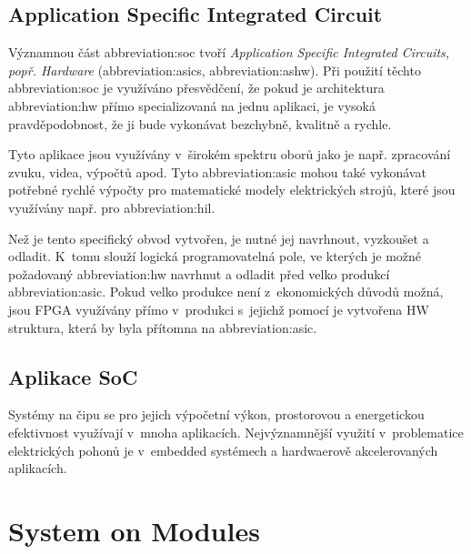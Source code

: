 \documentclass[a4paper, twoside, 11pt]{article}
\begin{document}
	\subsection{Application Specific Integrated Circuit}
		Významnou část \gls{abbreviation:soc} tvoří \textit{Application Specific Integrated Circuits, popř. Hardware} (\gls{abbreviation:asics}, \gls{abbreviation:ashw}). Při použití těchto \gls{abbreviation:soc} je využíváno přesvědčení, že pokud je architektura \gls{abbreviation:hw} přímo specializovaná na jednu aplikaci, je vysoká pravděpodobnost, že ji bude vykonávat bezchybně, kvalitně a rychle.\par
		Tyto aplikace jsou využívány v~širokém spektru oborů jako je např. zpracování zvuku, videa, výpočtů apod. Tyto \gls{abbreviation:asic} mohou také vykonávat potřebné rychlé výpočty pro matematické modely elektrických strojů, které jsou využívány např. pro \gls{abbreviation:hil}.\par
		Než je tento specifický obvod vytvořen, je nutné jej navrhnout, vyzkoušet a odladit. K~tomu slouží logická programovatelná pole, ve kterých je možné požadovaný \gls{abbreviation:hw} navrhnut a odladit před velko produkcí \gls{abbreviation:asic}. Pokud velko produkce není z~ekonomických důvodů možná, jsou FPGA využívány přímo v~produkci s~jejichž pomocí je vytvořena HW struktura, která by byla přítomna na \gls{abbreviation:asic}.


	\subsection{Aplikace SoC}
	Systémy na čipu se pro jejich výpočetní výkon, prostorovou a energetickou efektivnost využívají v~mnoha aplikacích. Nejvýznamnější využití v~problematice elektrických pohonů je v~embedded systémech a hardwaerově akcelerovaných aplikacích.

\section{System on Modules}\label{sec:system-on-modules}
\end{document}
